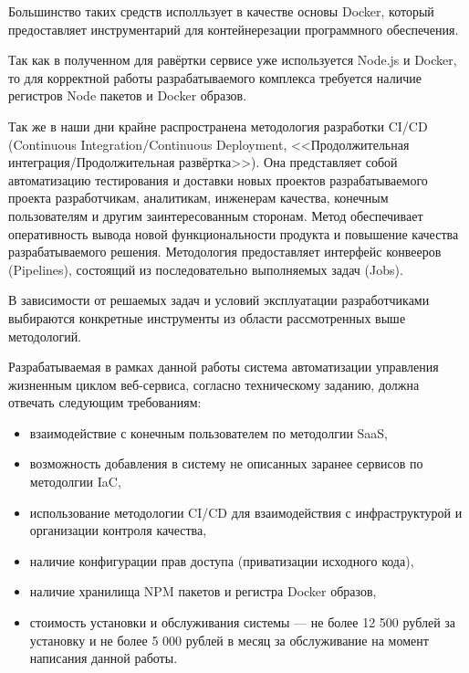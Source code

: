 Большинство таких средств исполльзует в качестве основы Docker, который предоставляет инструментарий для контейнерезации программного обеспечения.

Так как в полученном для равёртки сервисе уже используется Node.js и Docker, то для корректной работы разрабатываемого комплекса требуется наличие регистров Node пакетов и Docker образов.

Так же в наши дни крайне распространена методология разработки CI/CD (Continuous Integration/Continuous Deployment, <<Продолжительная интеграция/Продолжительная развёртка>>).
Она представляет собой автоматизацию тестирования и доставки новых проектов разрабатываемого проекта разработчикам, аналитикам, инженерам качества, конечным пользователям и другим заинтересованным сторонам.
Метод обеспечивает оперативность вывода новой функциональности продукта и повышение качества разрабатываемого решения.
Методология предоставляет интерфейс конвееров (Pipelines), состоящий из последовательно выполняемых задач (Jobs).

В зависимости от решаемых задач и условий эксплуатации разработчиками выбираются конкретные инструменты из области рассмотренных выше методологий.

Разрабатываемая в рамках данной работы система автоматизации управления жизненным циклом веб-сервиса,
согласно техническому заданию, должна отвечать следующим требованиям:

\begin{itemize}
    \item взаимодействие с конечным пользователем по методолгии SaaS,
    \item возможность добавления в систему не описанных заранее сервисов по методолгии IaC,
    \item использование методологии CI/CD для взаимодействия с инфраструктурой и организации контроля качества,
    \item наличие конфигурации прав доступа (приватизации исходного кода),
    \item наличие хранилища NPM пакетов и регистра Docker образов,
    \item стоимость установки и обслуживания системы --- не более 12 500 рублей за установку и не более 5 000 рублей в месяц за обслуживание на момент написания данной работы.
\end{itemize}

